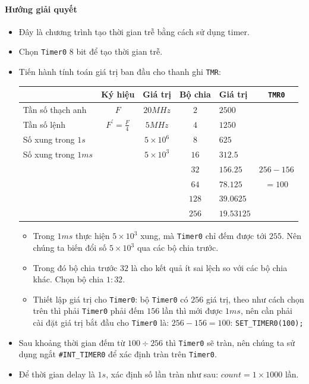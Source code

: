 \paragraph{Hướng giải quyết}
\begin{itemize}
\item Đây là chương trình tạo thời gian trễ bằng cách sử dụng timer.
\item Chọn \verb|Timer0| $8$ bit để tạo thời gian trễ.
\item Tiến hành tính toán giá trị ban đầu cho thanh ghi \verb|TMR|: 
\begin{center}
\begin{tabular}{l|c|c|c|l|c}
\centering{Thông số} & Ký hiệu & Giá trị & Bộ chia & Giá trị &\verb|TMR0| \\ \hline
Tần số thạch anh & $F$ & $20MHz$ & $2$ & $2500$ & \\
Tần số lệnh & $\displaystyle F^\prime = \frac{F}{4}$ & $5MHz$ & $4$ & $1250$ &\\
Số xung trong $1s$ &  & $5 \times 10^6$ & $8$ & $625$ &\\
Số xung trong $1ms$ &  & $5 \times 10^3$ & $16$ & $312.5$ &\\
&  & & $32$ & $156.25$ & $256 - 156$\\
&  & & $64$ & $78.125$ &$= 100$\\
&  & & $128$ & $39.0625$ &\\
&  & & $256$ & $19.53125$ &\\
\end{tabular}
\end{center}
\begin{itemize}
\item Trong $1ms$ thực hiện $5 \times 10^3$ xung, mà \verb|Timer0| chỉ đếm được tới $255$. Nên chúng ta biến đổi số $5 \times 10^3$ qua các bộ chia trước.
\item Trong đó bộ chia trước $32$ là cho kết quả ít sai lệch so với các bộ chia khác. Chọn bộ chia $1:32$.
\item Thiết lập giá trị cho \verb|Timer0|: bộ \verb|Timer0| có $256$ giá trị, theo như cách chọn trên thì phải \verb|Timer0| phải đếm $156$ lần thì mới được $1ms$, nên cần phải cài đặt giá trị bắt đầu cho \verb|Timer0| là: $256 - 156 = 100$: \verb|SET_TIMER0(100);|
\end{itemize}
\item Sau khoảng thời gian đếm từ $100 \div 256$ thì \verb|Timer0| sẽ tràn, nên chúng ta sử dụng ngắt \verb|#INT_TIMER0| để xác định tràn trên \verb|Timer0|.
\item Để thời gian delay là $1s$, xác định số lần tràn như sau: $ count = 1 \times 1000$ lần.

\end{itemize}
